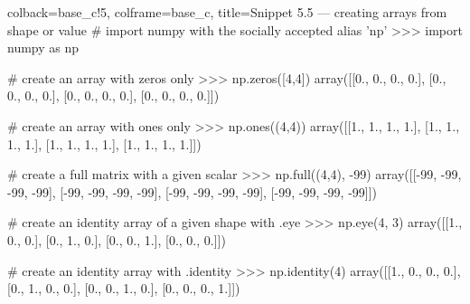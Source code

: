 \documentclass[a4paper,11pt]{book}
\numberwithin{figure}{chapter}
\numberwithin{table}{chapter}
\begin{document}
\begin{pythoncode}[linenos=true,]{colback=base_c!5, colframe=base_c, title=\sffamily Snippet 5.5 --- creating arrays from shape or value}
# import numpy with the socially accepted alias 'np'
>>> import numpy as np

# create an array with zeros only
>>> np.zeros([4,4])
array([[0., 0., 0., 0.],
       [0., 0., 0., 0.],
       [0., 0., 0., 0.],
       [0., 0., 0., 0.]])

# create an array with ones only
>>> np.ones((4,4))
array([[1., 1., 1., 1.],
       [1., 1., 1., 1.],
       [1., 1., 1., 1.],
       [1., 1., 1., 1.]])

# create a full matrix with a given scalar
>>> np.full((4,4), -99)
array([[-99, -99, -99, -99],
       [-99, -99, -99, -99],
       [-99, -99, -99, -99],
       [-99, -99, -99, -99]])

# create an identity array of a given shape with .eye 
>>> np.eye(4, 3)
array([[1., 0., 0.],
       [0., 1., 0.],
       [0., 0., 1.],
       [0., 0., 0.]])

# create an identity array with .identity
>>> np.identity(4)
array([[1., 0., 0., 0.],
       [0., 1., 0., 0.],
       [0., 0., 1., 0.],
       [0., 0., 0., 1.]])
\end{pythoncode}
\clearpage
\end{document}
